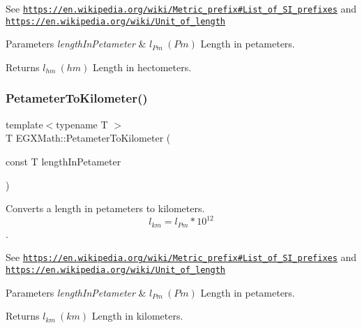 See \href{https://en.wikipedia.org/wiki/Metric_prefix#List_of_SI_prefixes}{\tt https\+://en.\+wikipedia.\+org/wiki/\+Metric\+\_\+prefix\#\+List\+\_\+of\+\_\+\+S\+I\+\_\+prefixes} and \href{https://en.wikipedia.org/wiki/Unit_of_length}{\tt https\+://en.\+wikipedia.\+org/wiki/\+Unit\+\_\+of\+\_\+length} 
\begin{DoxyParams}{Parameters}
{\em length\+In\+Petameter} & $ l_{Pm}\ (Pm)$ Length in petameters. \\
\hline
\end{DoxyParams}
\begin{DoxyReturn}{Returns}
$ l_{hm}\ (hm)$ Length in hectometers. 
\end{DoxyReturn}
\mbox{\label{group___e_g_x_math-_conversions-_length_conversions-_s_i-_petameter-_s_i_gadf5a6ef57468284f06662fd7c59ad5ee}} 
\subsubsection{\texorpdfstring{Petameter\+To\+Kilometer()}{PetameterToKilometer()}}
{\footnotesize\ttfamily template$<$typename T $>$ \\
T E\+G\+X\+Math\+::\+Petameter\+To\+Kilometer (\begin{DoxyParamCaption}\item[{const T}]{length\+In\+Petameter }\end{DoxyParamCaption})}



Converts a length in petameters to kilometers. \[ l_{km}=l_{Pm} * 10^{12} \]. 

See \href{https://en.wikipedia.org/wiki/Metric_prefix#List_of_SI_prefixes}{\tt https\+://en.\+wikipedia.\+org/wiki/\+Metric\+\_\+prefix\#\+List\+\_\+of\+\_\+\+S\+I\+\_\+prefixes} and \href{https://en.wikipedia.org/wiki/Unit_of_length}{\tt https\+://en.\+wikipedia.\+org/wiki/\+Unit\+\_\+of\+\_\+length} 
\begin{DoxyParams}{Parameters}
{\em length\+In\+Petameter} & $ l_{Pm}\ (Pm)$ Length in petameters. \\
\hline
\end{DoxyParams}
\begin{DoxyReturn}{Returns}
$ l_{km}\ (km)$ Length in kilometers. 
\end{DoxyReturn}
\mbox{\label{group___e_g_x_math-_conversions-_length_conversions-_s_i-_petameter-_s_i_gabee8390ae6476b4718cf82fc87ae7a1e}} 
